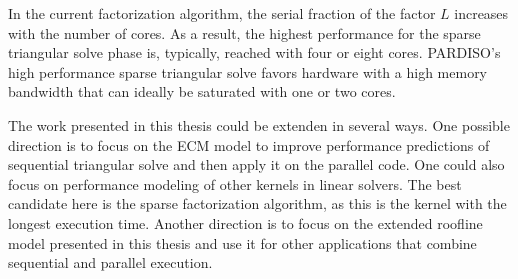 In the current factorization algorithm, the serial fraction of the factor $L$
increases with the number of cores. As a result, the highest performance for the sparse triangular solve phase is, typically, reached with four or eight cores.
PARDISO's high performance sparse triangular solve favors hardware with a high
memory bandwidth that can ideally be saturated with one or two cores.

The work presented in this thesis could be extenden in several ways. One possible direction is to focus on the ECM model to improve performance predictions of sequential triangular solve and then apply it on the parallel code.
One could also focus on performance modeling of other kernels in linear solvers. The best candidate here is the sparse factorization algorithm, as this is the kernel with the longest execution time.
Another direction is to focus on the extended roofline model presented in this thesis and use it for other applications that combine sequential and parallel execution.
